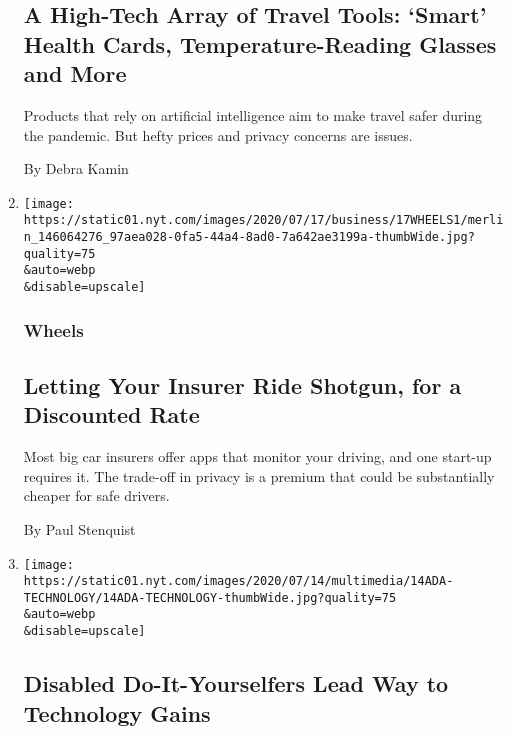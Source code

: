 \begin{enumerate}
  \hypertarget{a-high-tech-array-of-travel-tools-smart-health-cards-temperature-reading-glasses-and-more}{%
  \subsection{A High-Tech Array of Travel Tools: `Smart' Health Cards,
  Temperature-Reading Glasses and
  More}\label{a-high-tech-array-of-travel-tools-smart-health-cards-temperature-reading-glasses-and-more}}

  Products that rely on artificial intelligence aim to make travel safer
  during the pandemic. But hefty prices and privacy concerns are issues.

  By Debra Kamin
\item
  \href{/2020/07/16/business/car-insurance-app-discounts.html}{}

  \texttt{[image: https://static01.nyt.com/images/2020/07/17/business/17WHEELS1/merlin\_146064276\_97aea028-0fa5-44a4-8ad0-7a642ae3199a-thumbWide.jpg?quality=75\\\&auto=webp\\\&disable=upscale]}

  \hypertarget{wheels}{%
  \subsubsection{Wheels}\label{wheels}}

  \hypertarget{letting-your-insurer-ride-shotgun-for-a-discounted-rate}{%
  \subsection{Letting Your Insurer Ride Shotgun, for a Discounted
  Rate}\label{letting-your-insurer-ride-shotgun-for-a-discounted-rate}}

  Most big car insurers offer apps that monitor your driving, and one
  start-up requires it. The trade-off in privacy is a premium that could
  be substantially cheaper for safe drivers.

  By Paul Stenquist
\item
  \href{/2020/07/14/style/assistive-technology.html}{}

  \texttt{[image: https://static01.nyt.com/images/2020/07/14/multimedia/14ADA-TECHNOLOGY/14ADA-TECHNOLOGY-thumbWide.jpg?quality=75\\\&auto=webp\\\&disable=upscale]}

  \hypertarget{disabled-do-it-yourselfers-lead-way-to-technology-gains}{%
  \subsection{Disabled Do-It-Yourselfers Lead Way to Technology
  Gains}\label{disabled-do-it-yourselfers-lead-way-to-technology-gains}}


\end{enumerate}
